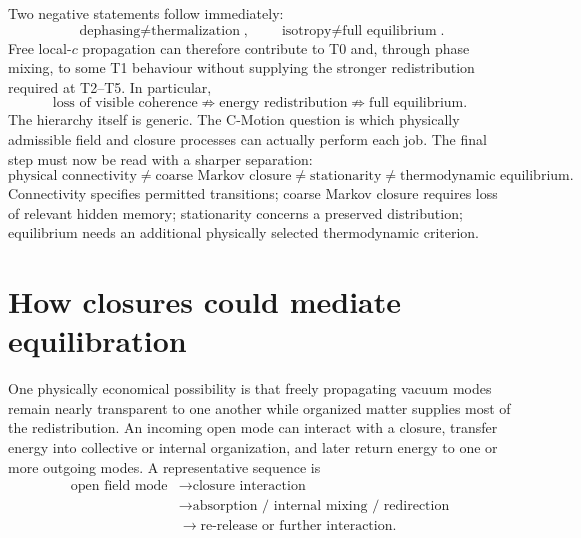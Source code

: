 \documentclass[11pt]{article}
\theoremstyle{definition}
\newcommand{\cmotion}{\mbox{C-Motion}}
\begin{document}
Two negative statements follow immediately:
\begin{equation}
  \boxed{\text{dephasing}\neq\text{thermalization}},
  \qquad
  \boxed{\text{isotropy}\neq\text{full equilibrium}}.
  \label{eq:dephasing-negative}
\end{equation}
Free local-$c$ propagation can therefore contribute to T0 and, through phase mixing, to
some T1 behaviour without supplying the stronger redistribution required at T2--T5.  In
particular,
\begin{equation}
  \boxed{
  \text{loss of visible coherence}
  \not\Rightarrow
  \text{energy redistribution}
  \not\Rightarrow
  \text{full equilibrium}.}
  \label{eq:thermalization-ladder-negative}
\end{equation}
The hierarchy itself is generic.  The \cmotion{} question is which physically admissible
field and closure processes can actually perform each job.  The final step must now be read
with a sharper separation:
\begin{equation}
  \boxed{
  \text{physical connectivity}
  \neq
  \text{coarse Markov closure}
  \neq
  \text{stationarity}
  \neq
  \text{thermodynamic equilibrium}.}
  \label{eq:t5-sharpened}
\end{equation}
Connectivity specifies permitted transitions; coarse Markov closure requires
loss of relevant hidden memory; stationarity concerns a preserved distribution;
equilibrium needs an additional physically selected thermodynamic criterion.

\section{How closures could mediate equilibration}
\label{sec:matter-mediated}
One physically economical possibility is that freely propagating vacuum modes remain nearly
transparent to one another while organized matter supplies most of the redistribution.  An
incoming open mode can interact with a closure, transfer energy into collective or internal
organization, and later return energy to one or more outgoing modes.  A representative
sequence is
\begin{equation}
  \boxed{
  \begin{aligned}
  \text{open field mode}
  &\longrightarrow \text{closure interaction} \\
  &\longrightarrow \text{absorption / internal mixing / redirection} \\
  &\longrightarrow \text{re-release or further interaction}.
  \end{aligned}}
  \label{eq:closure-cycle}
\end{equation}
\end{document}

